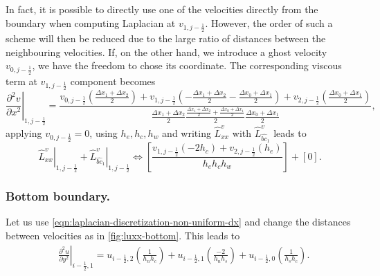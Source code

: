 \documentclass{article}
\numberwithin{equation}{section}
\begin{document}
In fact, it is possible to directly use one of the velocities directly from the boundary when computing Laplacian at $v_{1,j-\frac{1}{2}}$. 
However, the order of such a scheme will then be reduced due to the large ratio of distances between the neighbouring velocities. 
If, on the other hand, we introduce a ghost velocity $v_{0,j-\frac{1}{2}}$, we have the freedom to chose its coordinate.
The corresponding viscous term at $v_{1,j-\frac{1}{2}}$ component becomes
\begin{equation}\label{eqn:laplacian-discretization-v-left-deltax}
\left.\frac{\partial^2 v}{\partial x^2}\right|_{1,j-\frac{1}{2}}=
\frac{
	v_{0,j-\frac{1}{2}}\left(\frac{\Delta x_1 + \Delta x_2}{2}\right)
	+v_{1,j-\frac{1}{2}}\left(-\frac{\Delta x_1 + \Delta x_2}{2}-\frac{\Delta x_0 + \Delta x_1}{2}\right)
	+v_{2,j-\frac{1}{2}}\left(\frac{\Delta x_0 + \Delta x_1}{2}\right)
}
{\frac{\Delta x_1 + \Delta x_2}{2} \frac{\frac{\Delta x_1 + \Delta x_2}{2}+\frac{\Delta x_0 + \Delta x_1}{2}}{2} \frac{\Delta x_0 + \Delta x_1}{2}},
\end{equation}
applying $v_{0,j-\frac{1}{2}}=0$, using $h_e,h_c,h_w$ and writing $\hat{L}^v_{xx}$ with $\hat{L}^v_{\hat{bc}_1}$ leads to
\begin{equation}\label{eqn:laplacian-discretization-v-left}
\left.\hat{L}^v_{xx}\right|_{1,j-\frac{1}{2}}+\left.\hat{L}^v_{\hat{bc}_1}\right|_{1,j-\frac{1}{2}}\iff
\left[\frac{
	v_{1,j-\frac{1}{2}}\left(-2h_c\right)
	+v_{2,j-\frac{1}{2}}\left(h_e\right)
}
{h_e h_c h_w}\right]
+\left[0\right].
\end{equation}




\subsubsection{Bottom boundary.}\label{sec:laplaciat-bot}
Let us use \cref{eqn:laplacian-discretization-non-uniform-dx} and change the distances between velocities as in \cref{fig:luxx-bottom}. This leads to
\begin{equation}
\begin{aligned}
&\left.\frac{\partial^ 2 u}{\partial y^2}\right|_{i-\frac{1}{2},1}=u_{i-\frac{1}{2},2}\left(\frac{1}{h_n h_c}\right)+u_{i-\frac{1}{2},1}\left(\frac{-2}{h_n h_s}\right)+u_{i-\frac{1}{2},0}\left(\frac{1}{h_s h_c}\right).\\
\end{aligned}
\end{equation}
\end{document}
